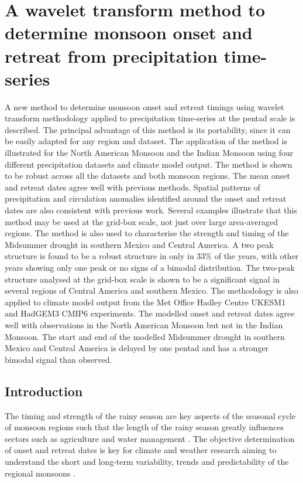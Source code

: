 \chapter{\label{ch:5-msd}A wavelet transform method to determine monsoon onset and retreat from precipitation time-series}

A new method to determine monsoon onset and retreat timings using wavelet transform methodology applied to precipitation time-series at the pentad scale is described.  The principal advantage of this method is its portability, since it can be easily adapted for any region and dataset. The application of the method is illustrated for the North American Monsoon and the Indian Monsoon using four different precipitation datasets and climate model output. The  method is shown to be robust across all the datasets and both monsoon regions. The mean onset and retreat dates  agree well with previous methods.  Spatial patterns of precipitation and circulation anomalies identified around the onset and retreat dates are also consistent with previous work. Several examples illustrate that this method may be used at the grid-box scale, not just over large area-averaged regions.
The method is also used to characterise the strength and timing of the Midsummer drought in southern Mexico and Central America.
A two peak structure is found to be a robust structure in only in 33\% of the years, with other years showing only one peak or no signs of a bimodal distribution. The two-peak structure analysed at the grid-box scale is shown to be a significant signal in several regions of Central America and southern Mexico. The methodology is also applied to climate model output from the Met Office Hadley Centre UKESM1 and HadGEM3 CMIP6 experiments. The modelled onset and retreat dates agree well with observations in the North American Monsoon but not in the Indian Monsoon. The start and end of the modelled Midsummer drought in southern Mexico and Central America is delayed by one pentad and has a stronger bimodal signal than observed.

\section{Introduction}

The timing and strength of the rainy season are key aspects of the seasonal cycle of monsoon regions such that the length of the rainy season greatly influences sectors such as agriculture \citep{sultan2005,Gadgil2006,jain2015,harvey2018} and water management \citep{turner2012,bussman2016}.
The objective determination of onset and retreat dates is key for climate and weather research aiming to understand the short and long-term variability, trends and predictability of the regional monsoons  \citep[e.g.][]{kitoh2006,cook2009,picher,nieto2011,htway2011}. 

